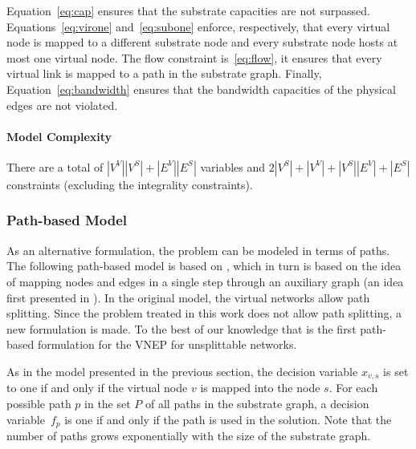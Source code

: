 Equation~\ref{eq:cap} ensures that the substrate capacities are not surpassed. Equations~\ref{eq:virone} and~\ref{eq:subone} enforce, respectively, that every virtual node is mapped to a different substrate node and every substrate node hosts at most one virtual node. The flow constraint is~\ref{eq:flow}, it ensures that every virtual link is mapped to a path in the substrate graph. Finally, Equation~\ref{eq:bandwidth} ensures that the bandwidth capacities of the physical edges are not violated.

\paragraph{Model Complexity}
There are a total of $|V^{V}||V^{S}| + |E^{V}||E^{S}|$ variables and $2|V^{S}| + |V^{V}| + |V^{S}||E^{V}| + |E^{S}|$ constraints (excluding the integrality constraints).


\subsubsection{Path-based Model}
As an alternative formulation, the problem can be modeled in terms of paths. The following path-based model is based on \cite{hu:2013}, which in turn is based on the idea of mapping nodes and edges in a single step through an auxiliary graph (an idea first presented in \cite{Chowdhury2009}). In the original model, the virtual networks allow path splitting. Since the problem treated in this work does not allow path splitting, a new formulation is made. To the best of our knowledge that is the first path-based formulation for the VNEP for unsplittable networks.

As in the model presented in the previous section, the decision variable $x_{v,s}$ is set to one if and only if the virtual node $v$ is mapped into the node $s$. For each possible path $p$ in the set $P$ of all paths in the substrate graph, a decision variable~$f_{p}$ is one if and only if the path is used in the solution. Note that the number of paths grows exponentially with the size of the substrate graph.

